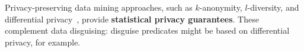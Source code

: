 

Privacy-preserving data mining approaches, such as $k$-anonymity, $l$-diversity, and
differential privacy~\cite{dataminingmodels, differential}, provide \textbf{statistical privacy
guarantees}.
%
These complement data disguising: disguise predicates might be based on
differential privacy, for example.
%





